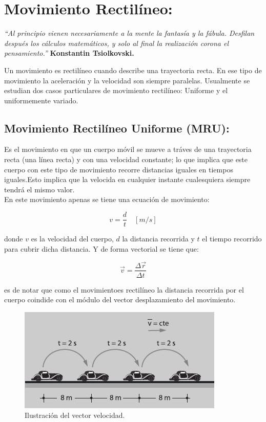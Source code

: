 \documentclass[a5paper,pagesize,10pt,bibtotoc,pointlessnumbers,
normalheadings,DIV=9,fleqn,x11names,table,twoside=false]{scrbook}
\begin{document}
\chapter{Movimiento Rectilíneo:}

\textit{``Al principio vienen necesariamente a la mente la fantasía y la fábula. Desfilan después los cálculos matemáticos, y solo 
al final la realización corona el pensamiento.''} \textbf{Konstantin Tsiolkovski.} 
\vspace{1.0 cm}

Un movimiento es rectilíneo cuando describe una trayectoria recta. En ese tipo de movimiento la aceleración y la velocidad son 
siempre paralelas. Usualmente se estudian dos casos particulares de movimiento rectilíneo: Uniforme y el uniformemente variado.

\section{Movimiento Rectilíneo Uniforme (MRU):}
 
Es el movimiento en que un cuerpo móvil se mueve a tráves de una trayectoria recta (una línea recta) y con una velocidad 
constante; lo que implica que este cuerpo con este tipo de movimiento recorre distancias iguales en tiempos iguales.Esto implica 
que la velocida en cualquier instante cualesquiera siempre
 tendrá el mismo valor.\\

En este movimiento apenas se tiene una ecuación de movimiento:

\begin{equation}
 v = \frac{d}{t}\quad [m/s]
\end{equation}

donde $v$ es la velocidad del cuerpo, $d$ la distancia recorrida y $t$ el tiempo recorrido para cubrir dicha distancia. Y de 
forma vectorial se tiene que:

\begin{equation}
 \vec{v} = \frac{\Delta\vec{r}}{\Delta t}
\end{equation}

es de notar que como el movimientoes rectilíneo la distancia recorrida por el cuerpo coindide con el módulo del vector 
desplazamiento del movimiento.\\
 
\begin{figure}[ht]
 \centering
 \includegraphics[scale=0.8]{images/Movimiento_rectilineo_uniforme.jpg}
 \caption{Ilustración del vector velocidad.}\label{mru}
\end{figure} 
 
\end{document}
